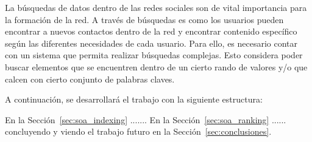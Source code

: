     La búsquedas de datos dentro de las redes sociales  son de vital importancia para la formación de la
    red. A través de búsquedas es como los usuarios
    pueden encontrar a nuevos contactos dentro de la red y encontrar contenido
    específico según las diferentes necesidades de cada usuario.  Para ello, es
    necesario contar con un sistema que permita realizar búsquedas complejas.
    Esto considera poder buscar elementos que se encuentren dentro de un cierto
    rando de valores y/o que calcen con cierto conjunto de palabras claves.




A continuación, se desarrollará el trabajo con la siguiente estructura:

En la Sección~\ref{sec:soa_indexing}
.......
En la Sección~\ref{sec:soa_ranking} 
......
 concluyendo y viendo el trabajo futuro
en la Sección~\ref{sec:conclusiones}.

